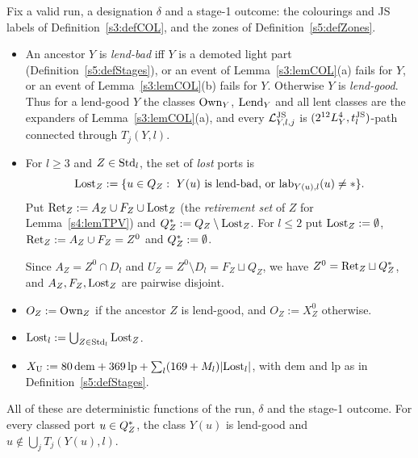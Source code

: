 \begin{definition}\label{s6:defLending}
Fix a valid run, a designation $\delta$ and a stage-1 outcome: the colourings and JS labels of Definition~\ref{s3:defCOL}, and the zones of Definition~\ref{s5:defZones}.
\begin{itemize}
\item An ancestor $Y$ is \emph{lend-bad} iff $Y$ is a demoted light part (Definition~\ref{s5:defStages}), or an event of Lemma~\ref{s3:lemCOL}(a) fails for $Y$, or an event of Lemma~\ref{s3:lemCOL}(b) fails for $Y$. Otherwise $Y$ is \emph{lend-good}. Thus for a lend-good $Y$ the classes $\mathrm{Own}_Y$, $\mathrm{Lend}_Y$ and all lent classes are the expanders of Lemma~\ref{s3:lemCOL}(a), and every $\mathcal{L}^{\mathrm{JS}}_{Y,l,j}$ is $(2^{12}L_Y^4,t^{\mathrm{JS}}_l)$-path connected through $T_j(Y,l)$.
\item For $l\ge3$ and $Z\in\mathrm{Std}_l$, the set of \emph{lost} ports is
\[
\mathrm{Lost}_Z:=\{u\in Q_Z:\ Y(u)\text{ is lend-bad, or }\mathrm{lab}_{Y(u),l}(u)\neq*\}.
\]
Put $\mathrm{Ret}_Z:=A_Z\cup F_Z\cup\mathrm{Lost}_Z$ (the \emph{retirement set} of $Z$ for Lemma~\ref{s4:lemTPV}) and $Q^{*}_Z:=Q_Z\setminus\mathrm{Lost}_Z$. For $l\le2$ put $\mathrm{Lost}_Z:=\emptyset$, $\mathrm{Ret}_Z:=A_Z\cup F_Z=Z^0$ and $Q^{*}_Z:=\emptyset$.

Since $A_Z=Z^0\cap D_l$ and $U_Z=Z^0\setminus D_l=F_Z\sqcup Q_Z$, we have $Z^0=\mathrm{Ret}_Z\sqcup Q^{*}_Z$, and $A_Z,F_Z,\mathrm{Lost}_Z$ are pairwise disjoint.
\item $O_Z:=\mathrm{Own}_Z$ if the ancestor $Z$ is lend-good, and $O_Z:=X^0_Z$ otherwise.
\item $\mathrm{Lost}_l:=\bigcup_{Z\in\mathrm{Std}_l}\mathrm{Lost}_Z$.
\item $X_{\mathrm{U}}:=80\,\mathrm{dem}+369\,\mathrm{lp}+\sum_l(169+M_l)|\mathrm{Lost}_l|$, with $\mathrm{dem}$ and $\mathrm{lp}$ as in Definition~\ref{s5:defStages}.
\end{itemize}
All of these are deterministic functions of the run, $\delta$ and the stage-1 outcome. For every classed port $u\in Q^{*}_Z$, the class $Y(u)$ is lend-good and $u\notin\bigcup_jT_j(Y(u),l)$.
\deps{\ref{s3:defCOL}, \ref{s3:lemCOL}, \ref{s5:defStages}, \ref{s6:defDesign}, \ref{s5:defZones}}
\end{definition}

